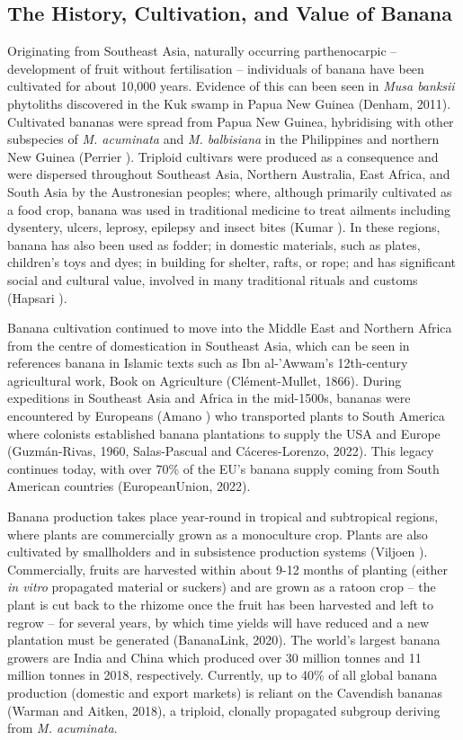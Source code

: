 \subsection{The History, Cultivation, and Value of Banana}

Originating from Southeast Asia, naturally occurring parthenocarpic – development of fruit without fertilisation – individuals of banana have been cultivated for about 10,000 years. Evidence of this can been seen in \textit{Musa banksii} phytoliths discovered in the Kuk swamp in Papua New Guinea (Denham, 2011). Cultivated bananas were spread from Papua New Guinea, hybridising with other subspecies of \textit{M. acuminata} and \textit{M. balbisiana} in the Philippines and northern New Guinea (Perrier ). Triploid cultivars were produced as a consequence and were dispersed throughout Southeast Asia, Northern Australia, East Africa, and South Asia by the Austronesian peoples; where, although primarily cultivated as a food crop, banana was used in traditional medicine to treat ailments including dysentery, ulcers, leprosy, epilepsy and insect bites (Kumar ). In these regions, banana has also been used as fodder; in domestic materials, such as plates, children’s toys and dyes; in building for shelter, rafts, or rope; and has significant social and cultural value, involved in many traditional rituals and customs (Hapsari ).  

Banana cultivation continued to move into the Middle East and Northern Africa from the centre of domestication in Southeast Asia, which can be seen in references banana in Islamic texts such as Ibn al-'Awwam's 12th-century agricultural work, Book on Agriculture (Clément-Mullet, 1866). During expeditions in Southeast Asia and Africa in the mid-1500s, bananas were encountered by Europeans (Amano ) who transported plants to South America where colonists established banana plantations to supply the USA and Europe (Guzmán-Rivas, 1960, Salas-Pascual and Cáceres-Lorenzo, 2022). This legacy continues today, with over 70\% of the EU’s banana supply coming from South American countries (EuropeanUnion, 2022).  

Banana production takes place year-round in tropical and subtropical regions, where plants are commercially grown as a monoculture crop. Plants are also cultivated by smallholders and in subsistence production systems (Viljoen ). Commercially, fruits are harvested within about 9-12 months of planting (either\textit{ in vitro} propagated material or suckers) and are grown as a ratoon crop – the plant is cut back to the rhizome once the fruit has been harvested and left to regrow – for several years, by which time yields will have reduced and a new plantation must be generated (BananaLink, 2020). The world’s largest banana growers are India and China which produced over 30 million tonnes and 11 million tonnes in 2018, respectively.  Currently, up to 40\% of all global banana production (domestic and export markets) is reliant on the Cavendish bananas (Warman and Aitken, 2018), a triploid, clonally propagated subgroup deriving from \textit{M. acuminata}. 

